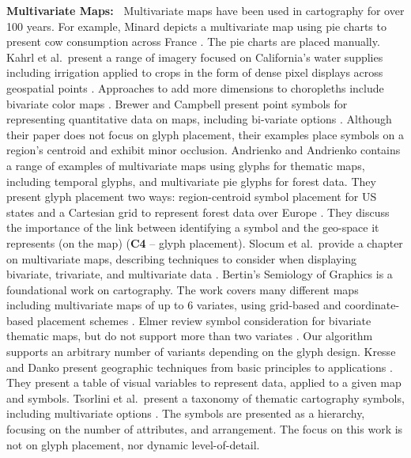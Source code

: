 \textbf{Multivariate Maps:~} Multivariate maps have been used in cartography for over 100 years. For example, Minard depicts a multivariate map using pie charts to present cow consumption across France \cite{minard1858carte}. The pie charts are placed manually.
Kahrl et al.\ present a range of imagery focused on California's water supplies including irrigation applied to crops in the form of dense pixel displays across geospatial points \cite{kahrl1978california}. 
Approaches to add more dimensions to choropleths include bivariate color maps \cite{olson1981spectrally, dunn1989dynamic}.
Brewer and Campbell present point symbols for representing quantitative data on maps, including bi-variate options \cite{brewer1998beyond}. Although their paper does not focus on glyph placement, their examples place symbols on a region's centroid and exhibit minor occlusion.
Andrienko and Andrienko \cite{andrienko2006exploratory} contains a range of examples of multivariate maps using glyphs for thematic maps, including temporal glyphs, and multivariate pie glyphs for forest data. They present glyph placement two ways: region-centroid symbol placement for US states and a Cartesian grid to represent forest data over Europe \cite{andrienko2006exploratory}. They discuss the importance of the link between identifying a symbol and the geo-space it represents (on the map) (\textbf{C4} -- glyph placement).
Slocum et al.\ provide a chapter on multivariate maps, describing techniques to consider when displaying bivariate, trivariate, and multivariate data \cite{slocum2009thematic}. 
Bertin's Semiology of Graphics is a foundational work on cartography. The work covers many different maps including multivariate maps of up to 6 variates, using grid-based and coordinate-based placement schemes \cite{bertin1983semiology}.
Elmer review symbol consideration for bivariate thematic maps, but do not support more than two variates \cite{elmer2012symbol}. Our algorithm supports an arbitrary number of variants depending on the glyph design.
Kresse and Danko present geographic techniques from basic principles to applications \cite{kresse2012springer}. They present a table of visual variables to represent data, applied to a given map and symbols.
Tsorlini et al.\ present a taxonomy of thematic cartography symbols, including multivariate options \cite{tsorlini2017designing}. The symbols are presented as a hierarchy, focusing on the number of attributes, and arrangement. The focus on this work is not on glyph placement, nor dynamic level-of-detail.


